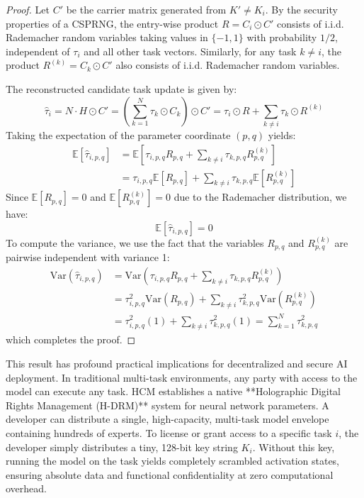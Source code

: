 \documentclass{article}
\begin{document}
\begin{proof}
Let $C'$ be the carrier matrix generated from $K' \neq K_i$. By the security properties of a CSPRNG, the entry-wise product $R = C_i \odot C'$ consists of i.i.d. Rademacher random variables taking values in $\{-1, 1\}$ with probability $1/2$, independent of $\tau_i$ and all other task vectors. Similarly, for any task $k \neq i$, the product $R^{(k)} = C_k \odot C'$ also consists of i.i.d. Rademacher random variables.

The reconstructed candidate task update is given by:
\begin{equation}
    \hat{\tau}_i = N \cdot H \odot C' = \left( \sum_{k=1}^N \tau_k \odot C_k \right) \odot C' = \tau_i \odot R + \sum_{k \neq i} \tau_k \odot R^{(k)}
\end{equation}
Taking the expectation of the parameter coordinate $(p, q)$ yields:
\begin{align*}
    \mathbb{E}[\hat{\tau}_{i, p, q}] &= \mathbb{E}\left[ \tau_{i, p, q} R_{p, q} + \sum_{k \neq i} \tau_{k, p, q} R^{(k)}_{p, q} \right] \\
    &= \tau_{i, p, q} \mathbb{E}[R_{p, q}] + \sum_{k \neq i} \tau_{k, p, q} \mathbb{E}[R^{(k)}_{p, q}]
\end{align*}
Since $\mathbb{E}[R_{p, q}] = 0$ and $\mathbb{E}[R^{(k)}_{p, q}] = 0$ due to the Rademacher distribution, we have:
\begin{equation}
    \mathbb{E}[\hat{\tau}_{i, p, q}] = 0
\end{equation}
To compute the variance, we use the fact that the variables $R_{p, q}$ and $R^{(k)}_{p, q}$ are pairwise independent with variance 1:
\begin{align*}
    \text{Var}(\hat{\tau}_{i, p, q}) &= \text{Var}\left( \tau_{i, p, q} R_{p, q} + \sum_{k \neq i} \tau_{k, p, q} R^{(k)}_{p, q} \right) \\
    &= \tau_{i, p, q}^2 \text{Var}(R_{p, q}) + \sum_{k \neq i} \tau_{k, p, q}^2 \text{Var}(R^{(k)}_{p, q}) \\
    &= \tau_{i, p, q}^2 (1) + \sum_{k \neq i} \tau_{k, p, q}^2 (1) = \sum_{k=1}^N \tau_{k, p, q}^2
\end{align*}
which completes the proof.
\end{proof}

This result has profound practical implications for decentralized and secure AI deployment. In traditional multi-task environments, any party with access to the model can execute any task. HCM establishes a native **Holographic Digital Rights Management (H-DRM)** system for neural network parameters. A developer can distribute a single, high-capacity, multi-task model envelope containing hundreds of experts. To license or grant access to a specific task $i$, the developer simply distributes a tiny, 128-bit key string $K_i$. Without this key, running the model on the task yields completely scrambled activation states, ensuring absolute data and functional confidentiality at zero computational overhead.
\end{document}
